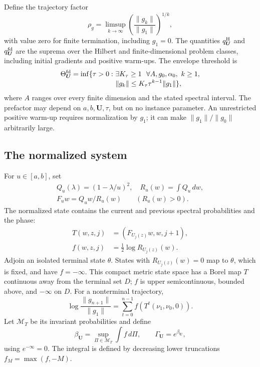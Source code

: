 \documentclass[letterpaper,twoside]{article}
\begin{document}
Define the trajectory factor
\[
 \rho_g=\limsup_{k\to\infty}
 \left(\frac{\|g_k\|}{\|g_1\|}\right)^{1/k},
\]
with value zero for finite termination, including $g_1=0$. The quantities $q^{\rm H}_{\bm U}$ and $q^{\rm fd}_{\bm U}$ are the suprema over the Hilbert and finite-dimensional problem classes, including initial gradients and positive warm-ups. The envelope threshold is
\begin{equation}\label{eq:threshold}
\begin{split}
 \Theta^{\rm fd}_{\bm U}
 =\inf\{\tau>0:\ &\exists K_\tau\ge1\ \ \forall A,g_0,\alpha_0,\ k\ge1,\\[-1mm]
 &\|g_k\|\le K_\tau\tau^{k-1}\|g_1\|\},
\end{split}
\end{equation}
where $A$ ranges over every finite dimension and the stated spectral interval. The prefactor may depend on $a,b,\bm U,\tau$, but on no instance parameter. An unrestricted positive warm-up requires normalization by $g_1$; it can make $\|g_1\|/\|g_0\|$ arbitrarily large.

\subsection{The normalized system}
For $u\in[a,b]$, set
\[
\begin{gathered}
 Q_u(\lambda)=(1-\lambda/u)^2,\quad R_u(w)=\int Q_u\,dw,\\
 F_uw=Q_uw/R_u(w)\qquad(R_u(w)>0).
\end{gathered}
\]
The normalized state contains the current and previous spectral probabilities and the phase:
\begin{align}
 T(w,z,j)&=(F_{U_j(z)}w,w,j+1),\label{eq:lift}\\
 f(w,z,j)&=\tfrac12\log R_{U_j(z)}(w).\nonumber
\end{align}
Adjoin an isolated terminal state $\theta$. States with $R_{U_j(z)}(w)=0$ map to $\theta$, which is fixed, and have $f=-\infty$. This compact metric state space has a Borel map $T$ continuous away from the terminal set $D$; $f$ is upper semicontinuous, bounded above, and $-\infty$ on $D$. For a nonterminal trajectory,
\begin{equation}\label{eq:cocycle-main}
 \log\frac{\|g_{n+1}\|}{\|g_1\|}
 =\sum_{t=0}^{n-1}f(T^t(\nu_1,\nu_0,0)).
\end{equation}
Let $\mathcal M_T$ be its invariant probabilities and define
\begin{equation}\label{eq:Gamma}
 \beta_{\bm U}=\sup_{\Pi\in\mathcal M_T}\int f\,d\Pi,
 \qquad \Gamma_{\bm U}=e^{\beta_{\bm U}},
\end{equation}
using $e^{-\infty}=0$. The integral is defined by decreasing lower truncations $f_M=\max(f,-M)$.
\end{document}
